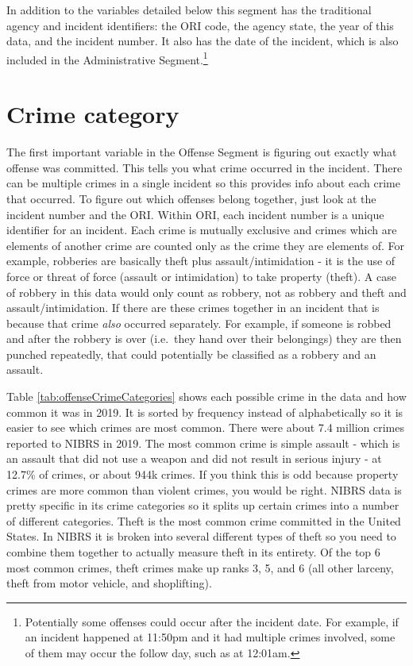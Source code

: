 \documentclass[
]{krantz}
\begin{document}
In addition to the variables detailed below this segment has
the traditional agency and incident identifiers: the ORI
code, the agency state, the year of this data, and the
incident number. It also has the date of the incident, which
is also included in the Administrative Segment.\footnote{Potentially
  some offenses could occur after the incident date. For
  example, if an incident happened at 11:50pm and it had
  multiple crimes involved, some of them may occur the
  follow day, such as at 12:01am.}

\section{Crime category}\label{crime-category}

The first important variable in the Offense Segment is
figuring out exactly what offense was committed. This tells
you what crime occurred in the incident. There can be
multiple crimes in a single incident so this provides info
about each crime that occurred. To figure out which offenses
belong together, just look at the incident number and the
ORI. Within ORI, each incident number is a unique identifier
for an incident. Each crime is mutually exclusive and crimes
which are elements of another crime are counted only as the
crime they are elements of. For example, robberies are
basically theft plus assault/intimidation - it is the use of
force or threat of force (assault or intimidation) to take
property (theft). A case of robbery in this data would only
count as robbery, not as robbery and theft and
assault/intimidation. If there are these crimes together in
an incident that is because that crime \emph{also} occurred
separately. For example, if someone is robbed and after the
robbery is over (i.e.~they hand over their belongings) they
are then punched repeatedly, that could potentially be
classified as a robbery and an assault.

Table \ref{tab:offenseCrimeCategories} shows each possible
crime in the data and how common it was in 2019. It is
sorted by frequency instead of alphabetically so it is
easier to see which crimes are most common. There were about
7.4 million crimes reported to NIBRS in 2019. The most
common crime is simple assault - which is an assault that
did not use a weapon and did not result in serious injury -
at 12.7\% of crimes, or about 944k crimes. If you think this
is odd because property crimes are more common than violent
crimes, you would be right. NIBRS data is pretty specific in
its crime categories so it splits up certain crimes into a
number of different categories. Theft is the most common
crime committed in the United States. In NIBRS it is broken
into several different types of theft so you need to combine
them together to actually measure theft in its entirety. Of
the top 6 most common crimes, theft crimes make up ranks 3,
5, and 6 (all other larceny, theft from motor vehicle, and
shoplifting).
\end{document}

